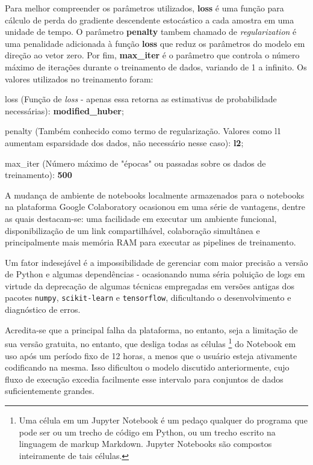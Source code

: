 Para melhor compreender os parâmetros utilizados, \textbf{loss} é uma função para cálculo de perda do gradiente descendente estocástico a cada amostra em uma unidade de tempo. O parâmetro \textbf{penalty} tambem chamado de \textit{regularization} é uma penalidade adicionada à função \textbf{loss} que reduz os parâmetros do modelo em direção ao vetor zero. Por fim, \textbf{max\_iter} é o parâmetro que controla o número máximo de iterações durante o treinamento de dados, variando de 1 a infinito. Os valores utilizados no treinamento foram:
\begin{alineas}
    \item loss (Função de \textit{loss} - apenas essa retorna as estimativas de probabilidade necessárias): \textbf{modified\_huber};
    \item penalty (Também conhecido como termo de regularização. Valores como l1 aumentam esparsidade dos dados, não necessário nesse caso): \textbf{l2};
    \item max\_iter (Número máximo de "épocas" ou passadas sobre os dados de treinamento): \textbf{500}
\end{alineas}


A mudança de ambiente de notebooks localmente armazenados para o notebooks na plataforma Google Colaboratory ocasionou em uma série de vantagens, dentre as quais destacam-se: uma facilidade em executar um ambiente funcional, disponibilização de um link compartilhável, colaboração simultânea e principalmente mais memória RAM para executar as pipelines de treinamento. 

Um fator indesejável é a impossibilidade de gerenciar com maior precisão a versão de Python e algumas dependências - ocasionando numa séria poluição de logs em virtude da deprecação de algumas técnicas empregadas em versões antigas dos pacotes \verb+numpy+, \verb+scikit-learn+ e \verb+tensorflow+, dificultando o desenvolvimento e diagnóstico de erros. 

Acredita-se que a principal falha da plataforma, no entanto, seja a limitação de sua versão gratuita, no entanto, que desliga todas as células \footnote{Uma célula em um Jupyter Notebook é um pedaço qualquer do programa que pode ser ou um trecho de código em Python, ou um trecho escrito na linguagem de markup Markdown. Jupyter Notebooks são compostos inteiramente de tais células.} do Notebook em uso após um período fixo de 12 horas, a menos que o usuário esteja ativamente codificando na mesma. Isso dificultou o modelo discutido anteriormente, cujo fluxo de execução excedia facilmente esse intervalo para conjuntos de dados suficientemente grandes.

